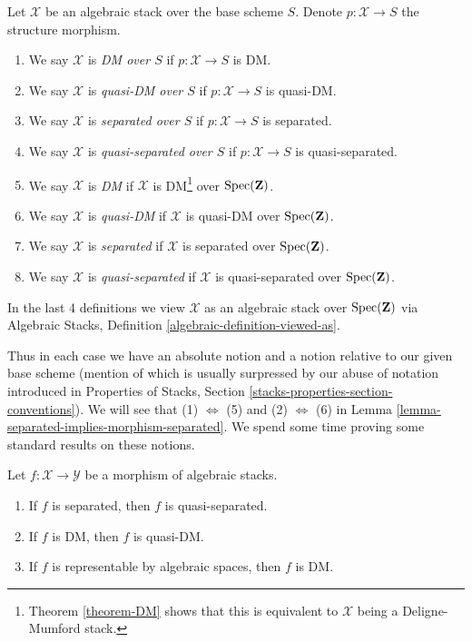\begin{definition}
\label{definition-absolute-separated}
Let $\mathcal{X}$ be an algebraic stack over the base scheme $S$.
Denote $p : \mathcal{X} \to S$ the structure morphism.
\begin{enumerate}
\item We say $\mathcal{X}$ is {\it DM over $S$}
if $p : \mathcal{X} \to S$ is DM.
\item We say $\mathcal{X}$ is {\it quasi-DM over $S$}
if $p : \mathcal{X} \to S$ is quasi-DM.
\item We say $\mathcal{X}$ is {\it separated over $S$}
if $p : \mathcal{X} \to S$ is separated.
\item We say $\mathcal{X}$ is {\it quasi-separated over $S$} if
$p : \mathcal{X} \to S$ is quasi-separated.
\item We say $\mathcal{X}$ is {\it DM}
if $\mathcal{X}$ is DM\footnote{Theorem \ref{theorem-DM} shows
that this is equivalent to $\mathcal{X}$ being a Deligne-Mumford stack.}
over $\mathop{\rm Spec}(\mathbf{Z})$.
\item We say $\mathcal{X}$ is {\it quasi-DM}
if $\mathcal{X}$ is quasi-DM over $\mathop{\rm Spec}(\mathbf{Z})$.
\item We say $\mathcal{X}$ is {\it separated} if $\mathcal{X}$
is separated over $\mathop{\rm Spec}(\mathbf{Z})$.
\item We say $\mathcal{X}$ is {\it quasi-separated} if $\mathcal{X}$
is quasi-separated over $\mathop{\rm Spec}(\mathbf{Z})$.
\end{enumerate}
In the last 4 definitions we view $\mathcal{X}$
as an algebraic stack over $\mathop{\rm Spec}(\mathbf{Z})$
via
Algebraic Stacks, Definition \ref{algebraic-definition-viewed-as}.
\end{definition}

\noindent
Thus in each case we have an absolute notion and a notion relative to
our given base scheme (mention of which is usually surpressed by our
abuse of notation introduced in
Properties of Stacks, Section \ref{stacks-properties-section-conventions}).
We will see that (1) $\Leftrightarrow$ (5) and (2) $\Leftrightarrow$ (6) in
Lemma \ref{lemma-separated-implies-morphism-separated}.
We spend some time proving some standard results on these notions.

\begin{lemma}
\label{lemma-trivial-implications}
Let $f : \mathcal{X} \to \mathcal{Y}$ be a morphism of algebraic stacks.
\begin{enumerate}
\item If $f$ is separated, then $f$ is quasi-separated.
\item If $f$ is DM, then $f$ is quasi-DM.
\item If $f$ is representable by algebraic spaces, then $f$ is DM.
\end{enumerate}
\end{lemma}

